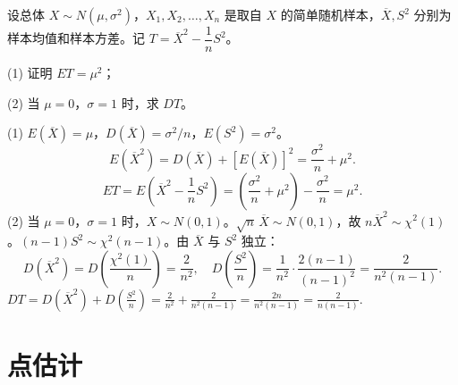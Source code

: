 \documentclass[lang=cn,11pt]{elegantbook}
\begin{document}
\begin{exercise}\label{exer:6-ET-DT}
设总体 \(X \sim N(\mu, \sigma^2)\)，\(X_1, X_2, \dots, X_n\) 是取自 \(X\) 的简单随机样本，\(\overline{X}, S^2\) 分别为样本均值和样本方差。记 \(T = \overline{X}^2 - \dfrac{1}{n}S^2\)。\par
(1) 证明 \(ET = \mu^2\)；\par
(2) 当 \(\mu = 0\)，\(\sigma = 1\) 时，求 \(DT\)。
\end{exercise}
\begin{solution}
(1) \(E(\overline{X}) = \mu\)，\(D(\overline{X}) = \sigma^2/n\)，\(E(S^2) = \sigma^2\)。
\[
E(\overline{X}^2) = D(\overline{X}) + [E(\overline{X})]^2 = \frac{\sigma^2}{n} + \mu^2.
\]
\[
ET = E\!\left(\overline{X}^2 - \frac{1}{n}S^2\right) = \left(\frac{\sigma^2}{n} + \mu^2\right) - \frac{\sigma^2}{n} = \mu^2. 
\]
(2) 当 \(\mu=0\)，\(\sigma=1\) 时，\(X \sim N(0,1)\)。\(\sqrt{n}\,\overline{X} \sim N(0,1)\)，故 \(n\overline{X}^2 \sim \chi^2(1)\)。\((n-1)S^2 \sim \chi^2(n-1)\)。由 \(\overline{X}\) 与 \(S^2\) 独立：
\[
D(\overline{X}^2) = D\!\left(\frac{\chi^2(1)}{n}\right) = \frac{2}{n^2},\quad D\!\left(\frac{S^2}{n}\right) = \frac{1}{n^2}\cdot\frac{2(n-1)}{(n-1)^2} = \frac{2}{n^2(n-1)}.
\]
\(
DT = D(\overline{X}^2) + D\!\left(\frac{S^2}{n}\right) = \frac{2}{n^2} + \frac{2}{n^2(n-1)} = \frac{2n}{n^2(n-1)} = \frac{2}{n(n-1)}.
\)
\end{solution}


\chapter{点估计}
\end{document}

